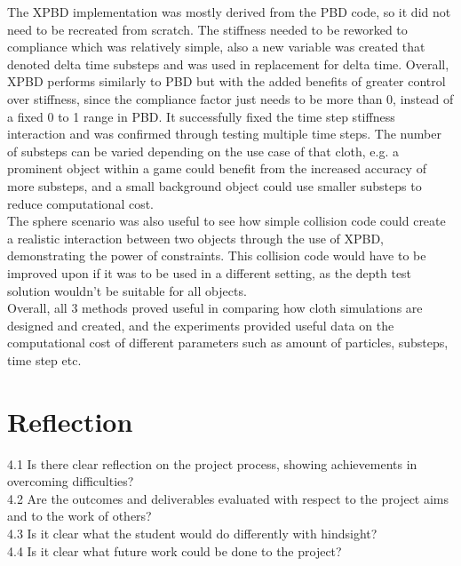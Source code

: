 \documentclass[12pt,a4paper]{article}
\begin{document}
The XPBD implementation was mostly derived from the PBD code, so it did not need to be recreated from scratch. The stiffness needed to be reworked to compliance which was relatively simple, also a new variable was created that denoted delta time substeps and was used in replacement for delta time. Overall, XPBD performs similarly to PBD but with the added benefits of greater control over stiffness, since the compliance factor just needs to be more than 0, instead of a fixed 0 to 1 range in PBD. It successfully fixed the time step stiffness interaction and was confirmed through testing multiple time steps. The number of substeps can be varied depending on the use case of that cloth, e.g. a prominent object within a game could benefit from the increased accuracy of more substeps, and a small background object could use smaller substeps to reduce computational cost. \\

The sphere scenario was also useful to see how simple collision code could create a realistic interaction between two objects through the use of XPBD, demonstrating the power of constraints. This collision code would have to be improved upon if it was to be used in a different setting, as the depth test solution wouldn't be suitable for all objects. \\

Overall, all 3 methods proved useful in comparing how cloth simulations are designed and created, and the experiments provided useful data on the computational cost of different parameters such as amount of particles, substeps, time step etc.

\section{Reflection}
\label{reffy}
4.1 Is there clear reflection on the project process, showing achievements in overcoming difficulties?\\
4.2 Are the outcomes and deliverables evaluated with respect to the project aims and to the work of others?\\
4.3 Is it clear what the student would do differently with hindsight?\\
4.4 Is it clear what future work could be done to the project? \\
\end{document}
